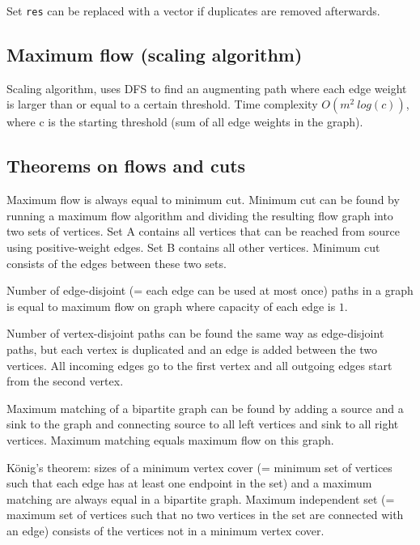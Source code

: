 \documentclass{article}
\begin{document}
Set \texttt{res} can be replaced with a vector if duplicates are removed afterwards.



\subsection {Maximum flow (scaling algorithm)}

Scaling algorithm, uses DFS to find an augmenting path where each edge weight is larger than or equal to a certain threshold. Time complexity $O(m^2 \ log(c))$, where c is the starting threshold (sum of all edge weights in the graph).



\subsection {Theorems on flows and cuts}

Maximum flow is always equal to minimum cut. Minimum cut can be found by running a maximum flow algorithm and dividing the resulting flow graph into two sets of vertices. Set A contains all vertices that can be reached from source using positive-weight edges. Set B contains all other vertices. Minimum cut consists of the edges between these two sets.

Number of edge-disjoint (= each edge can be used at most once) paths in a graph is equal to maximum flow on graph where capacity of each edge is $1$.

Number of vertex-disjoint paths can be found the same way as edge-disjoint paths, but each vertex is duplicated and an edge is added between the two vertices. All incoming edges go to the first vertex and all outgoing edges start from the second vertex.

Maximum matching of a bipartite graph can be found by adding a source and a sink to the graph and connecting source to all left vertices and sink to all right vertices. Maximum matching equals maximum flow on this graph.

König's theorem: sizes of a minimum vertex cover (= minimum set of vertices such that each edge has at least one endpoint in the set) and a maximum matching are always equal in a bipartite graph. Maximum independent set (= maximum set of vertices such that no two vertices in the set are connected with an edge) consists of the vertices not in a minimum vertex cover.
\end{document}
